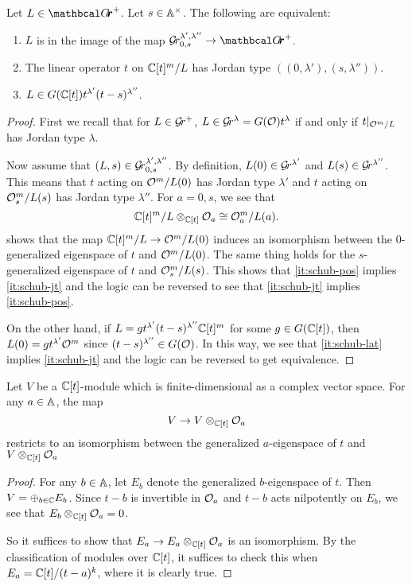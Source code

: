 \documentclass{article}
\begin{document}
\begin{lemma} 
\label{le:Grl1l2}
    Let $ L \in \Grth^+ $.  Let $ s \in \Ax$. The following are equivalent:
    \begin{enumerate}[label=(\roman*)]
        \item \label{it:schub-pos} $ L $ is in the image of the map $ \Gr^{\lambda', \lambda''}_{0,s} \rightarrow \Grth^+$. 
        \item \label{it:schub-jt} The linear operator $ t $ on $ \CC[t]^m/L$ has Jordan type $((0,\lambda'), (s,\lambda''))$.
        \item \label{it:schub-lat} $ L \in G(\CC[t]) t^{\lambda'} (t-s)^{\lambda''}$.
    \end{enumerate}
\end{lemma}
% 
\begin{proof}
First we recall that for $ L \in \Gr^+$, $ L \in \Gr^{\lambda} = G(\cO)t^\lambda $ if and only if $ t |_{\cO^m/L} $ has Jordan type $ \lambda$. 

Now assume that $ (L, s) \in \Gr^{\lambda', \lambda''}_{0,s}$.  By definition, $ L(0) \in \Gr^{\lambda'}$ and $L(s) \in \Gr^{\lambda''} $.  This means that $t $ acting on $\cO^m/L(0)$ has Jordan type $ \lambda'$ and $ t$ acting on $\cO_s^m/L(s)$ has Jordan type $ \lambda''$.  For $ a = 0, s$,  we see that $$\CC[t]^m/L \otimes_{\CC[t]} \cO_a \cong \cO_a^m / L(a). $$
 shows that the map $\CC[t]^m/L\to \cO^m/L(0)$ induces an isomorphism between the $0$-generalized eigenspace of $ t$ and $ \cO^m / L(0)$.   The same thing holds for the $s$-generalized eigenspace of $t $ and $ \cO_s^m/L(s)$. This shows that \cref{it:schub-pos} implies \cref{it:schub-jt} and the logic can be reversed to see that \cref{it:schub-jt} implies \cref{it:schub-pos}. 

On the other hand, if $ L = g t^{\lambda'} (t-s)^{\lambda''} \CC[t]^m$ for some $ g \in G(\CC[t])$, then $ L(0) = g t^{\lambda'}\cO^m $ since $ (t-s)^{\lambda''} \in G(\cO)$. In this way, we see that \cref{it:schub-lat} implies \cref{it:schub-jt} and the logic can be reversed to get equivalence.
\end{proof}

\begin{lemma} 
\label{le:linalg} 
Let $ V $ be a $ \CC[t]$-module which is finite-dimensional as a complex vector space.  For any  $ a \in \AA$, the map
$$ 
    V  \rightarrow V \otimes_{\CC[t]} \cO_a
$$
restricts to an isomorphism between the generalized $ a $-eigenspace of $ t $ and $ V \otimes_{\CC[t]} \cO_a$
\end{lemma}
% 
\begin{proof}
    For any $ b \in \AA$, let $ E_b $ denote the generalized $b$-eigenspace of $t$.  Then $ V = \oplus_{b \in \CC} E_b$.  Since $ t - b$ is invertible in $ \cO_a$ and $ t -b $ acts nilpotently on $ E_b$, we see that $ E_b \otimes_{\CC[t]} \cO_a = 0 $.
    
    So it suffices to show that $ E_a \rightarrow E_a \otimes_{\CC[t]} \cO_a$ is an isomorphism.  By the classification of modules over $ \CC[t]$, it suffices to check this when  $ E_a = \CC[t]/(t-a)^k$, where it is clearly true.
\end{proof}
% 
\end{document}
